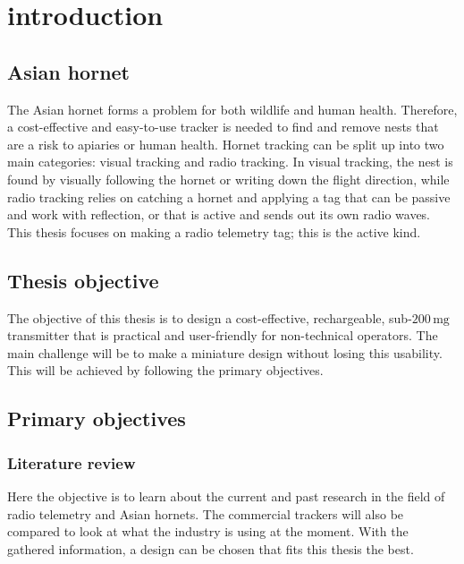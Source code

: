 

\chapter{introduction}\label{ch:introduction}



\section{Asian hornet}

The Asian hornet forms a problem for both wildlife and human health. Therefore, a cost-effective and easy-to-use tracker is needed to find and remove nests that are a risk to apiaries or human health. Hornet tracking can be split up into two main categories: visual tracking and radio tracking. In visual tracking, the nest is found by visually following the hornet or writing down the flight direction, while radio tracking relies on catching a hornet and applying a tag that can be passive and work with reflection, or that is active and sends out its own radio waves. This thesis focuses on making a radio telemetry tag; this is the active kind. 

\section{Thesis objective}

The objective of this thesis is to design a cost-effective, rechargeable, sub-$200\,\text{mg}$ transmitter that is practical and user-friendly for non-technical operators. The main challenge will be to make a miniature design without losing this usability. This will be achieved by following the primary objectives.

\section{Primary objectives}

\subsection{Literature review}
Here the objective is to learn about the current and past research in the field of radio telemetry and Asian hornets. The commercial trackers will also be compared to look at what the industry is using at the moment. With the gathered information, a design can be chosen that fits this thesis the best.

